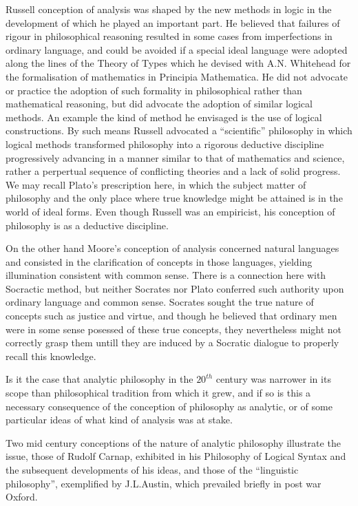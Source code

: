 Russell conception of analysis was shaped by the new methods in logic
in the development of which he played an important part.
He believed that failures of rigour in philosophical reasoning
resulted in some cases from imperfections in ordinary language, and
could be avoided if a special ideal language were adopted along the
lines of the Theory of Types which he devised with A.N. Whitehead
 for the formalisation of mathematics in
Principia Mathematica.
He did not advocate or practice the adoption of such formality in
philosophical rather than mathematical reasoning, but did advocate the
adoption of similar logical methods.
An example the kind of method he envisaged is the use of logical
constructions.
By such means Russell advocated a ``scientific'' philosophy in which
logical methods transformed philosophy into a rigorous deductive
discipline progressively advancing in a manner similar to that of
mathematics and science, rather a perpertual sequence of conflicting
theories and a lack of solid progress.
We may recall Plato's prescription here, in which the subject matter
of philosophy and the only place where true knowledge might be
attained is in the world of ideal forms.
Even though Russell was an empiricist, his conception of philosophy is
as a deductive discipline.

On the other hand Moore's conception of analysis concerned natural
languages and consisted in the clarification of
concepts in those languages, yielding illumination consistent with
common sense.
There is a connection here with Socractic method, but neither Socrates
nor Plato conferred such authority upon ordinary language and common
sense.
Socrates sought the true nature of concepts such as justice and
virtue, and though he believed that ordinary men were in some sense
posessed of these true concepts, they nevertheless might not correctly
grasp them untill they are induced by a Socratic dialogue to properly
recall this knowledge.

Is it the case that analytic philosophy in the $20^{th}$ century was
narrower in its scope than philosophical tradition from which it grew,
and if so is this a necessary consequence of the conception of
philosophy as analytic, or of some particular ideas of what kind of
analysis was at stake.

Two mid century conceptions of the nature of analytic philosophy
illustrate the issue, those of Rudolf Carnap, exhibited in his
Philosophy of Logical Syntax and the subsequent developments of his
ideas, and those of the ``linguistic philosophy'', exemplified by
J.L.Austin, which prevailed briefly in post war Oxford.

